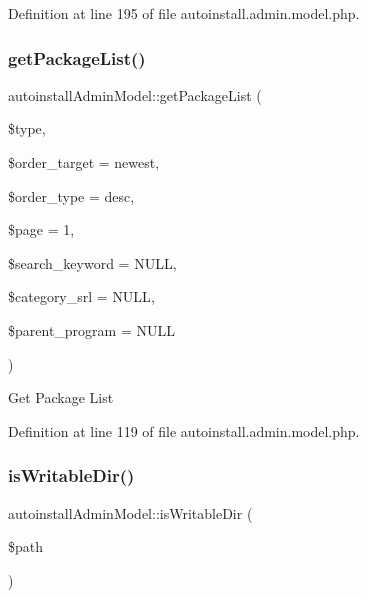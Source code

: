 Definition at line 195 of file autoinstall.\+admin.\+model.\+php.

\hypertarget{classautoinstallAdminModel_ab0899e286869ec16acb00080daf311fb}{}\label{classautoinstallAdminModel_ab0899e286869ec16acb00080daf311fb} 
\subsubsection{\texorpdfstring{get\+Package\+List()}{getPackageList()}}
{\footnotesize\ttfamily autoinstall\+Admin\+Model\+::get\+Package\+List (\begin{DoxyParamCaption}\item[{}]{\$type,  }\item[{}]{\$order\+\_\+target = {\ttfamily \textquotesingle{}newest\textquotesingle{}},  }\item[{}]{\$order\+\_\+type = {\ttfamily \textquotesingle{}desc\textquotesingle{}},  }\item[{}]{\$page = {\ttfamily \textquotesingle{}1\textquotesingle{}},  }\item[{}]{\$search\+\_\+keyword = {\ttfamily NULL},  }\item[{}]{\$category\+\_\+srl = {\ttfamily NULL},  }\item[{}]{\$parent\+\_\+program = {\ttfamily NULL} }\end{DoxyParamCaption})}

Get Package List 

Definition at line 119 of file autoinstall.\+admin.\+model.\+php.

\hypertarget{classautoinstallAdminModel_ab3314bacf64ba16ea88180124699fc54}{}\label{classautoinstallAdminModel_ab3314bacf64ba16ea88180124699fc54} 
\subsubsection{\texorpdfstring{is\+Writable\+Dir()}{isWritableDir()}}
{\footnotesize\ttfamily autoinstall\+Admin\+Model\+::is\+Writable\+Dir (\begin{DoxyParamCaption}\item[{}]{\$path }\end{DoxyParamCaption})}




